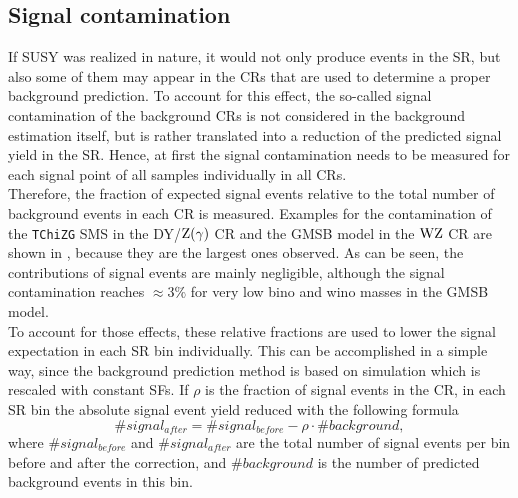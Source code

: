 \subsection{Signal contamination}\label{sec:signalCont}
If SUSY was realized in nature, it would not only produce events in the SR, but also some of them may appear in the CRs that are used to determine a proper background prediction. To account for this effect, the so-called signal contamination of the background CRs is not considered in the background estimation itself, but is rather translated into a reduction of the predicted signal yield in the SR. Hence, at first the signal contamination needs to be measured for each signal point of all samples individually in all CRs.\\
Therefore, the fraction of expected signal events relative to the total number of background events in each CR is measured. Examples for the contamination of the \texttt{TChiZG} SMS in the DY/$\mathrm{Z}(\gamma)$ CR and the GMSB model in the $\mathrm{W}\mathrm{Z}$ CR are shown in , because they are the largest ones observed. As can be seen, the contributions of signal events are mainly negligible, although the signal contamination reaches $\approx 3\%$ for very low bino and wino masses in the GMSB model.\\
To account for those effects, these relative fractions are used to lower the signal expectation in each SR bin individually. This can be accomplished in a simple way, since the background prediction method is based on simulation which is rescaled with constant SFs. If $\rho$ is the fraction of signal events in the CR, in each SR bin the absolute signal event yield reduced with the following formula
\begin{equation}
 \#signal_{after} = \#signal_{before} - \rho\cdot\#background,
\end{equation}
where $\#signal_{before}$ and $\#signal_{after}$ are the total number of signal events per bin before and after the correction, and $\#background$ is the number of predicted background events in this bin.

